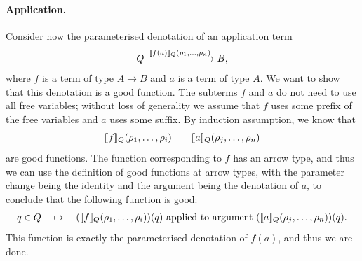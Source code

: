 \paragraph*{Application.} Consider now the parameterised denotation of an application term
 \begin{align*}
Q \xrightarrow{[\![f(a)]\!]_{Q}  (\rho_1,\ldots,\rho_n)} B,
\end{align*} 
where $f$ is a term of type $A \to B$ and $a$ is a term of type $A$. We want to show that this denotation is a good function. The subterms $f$ and $a$ do not need to use all free variables; without loss of generality we assume that $f$ uses some prefix of the free variables and $a$ uses some suffix. By induction assumption, we know that 
\begin{align*}
[\![f]\!]_{Q} (\rho_1,\ldots,\rho_i) \qquad 
[\![a]\!]_{Q} (\rho_j,\ldots,\rho_n)
\end{align*}
are good functions. The function corresponding to $f$ has an arrow type, and thus we can use the definition of good functions at arrow types, with the parameter change being the identity and the argument being the denotation of $a$, to conclude that the following function is good: 
\begin{align*}
q \in Q \quad \mapsto \quad ([\![f]\!]_{Q} (\rho_1,\ldots,\rho_i)) (q) \text{ applied to argument } ([\![a]\!]_{Q} (\rho_j,\ldots,\rho_n)) (q).
\end{align*}
This function is exactly the parameterised denotation of $f(a)$, and thus we are done.


